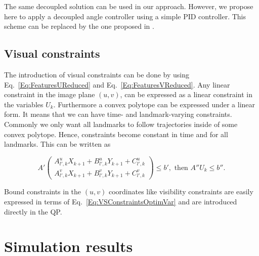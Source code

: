 
The same decoupled solution can be used in our approach. However, we propose here to apply a decoupled angle controller using a simple PID controller.
This scheme can be replaced by the one proposed in \cite{HerdtIROS2010}.

\subsection{Visual constraints}
The introduction of visual constraints can be done by using Eq.~\ref{Eq:FeaturesUReduced} and Eq.~\ref{Eq:FeaturesVReduced}.
Any linear constraint in the image plane $(u,v)$, can be expressed as a linear constraint in the variables $U_k$.
Furthermore a convex polytope can be expressed under a linear form.
%
It means that we can have time- and landmark-varying constraints. Commonly we only want all landmarks to follow trajectories inside of some convex polytope. Hence, constraints become constant in time and for all landmarks. This can be written as

\begin{equation}
 A'
 \left(
 \begin{matrix}
 A^u_{l',k} X_{k+1} + B^u_{l',k} Y_{k+1} + C^u_{l',k} \\
 A^v_{l',k} X_{k+1} + B^v_{l',k} Y_{k+1} + C^v_{l',k}
 \end{matrix}
 \right) \leq b',
 \text { then }
 A'' U_k \leq b''.
 \label{Eq:VSConstraintsOptimVar} 
\end{equation}

Bound constraints in the $(u,v)$ coordinates like visibility constraints are easily expressed in terms of Eq.~\ref{Eq:VSConstraintsOptimVar} and are introduced directly in the QP.

\section{Simulation results}

